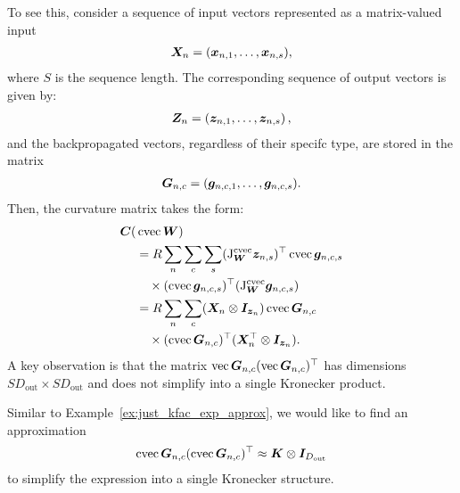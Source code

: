 To see this, consider a sequence of input vectors represented as a matrix-valued input
\begin{align*}
  {\bm{X}}_n = ({\bm{x}}_{n, 1}, \dots, {\bm{x}}_{n, s}),
\end{align*}
where $S$ is the sequence length.
The corresponding sequence of output vectors is given by:
\begin{align*}
{\bm{Z}}_n = \left( {\bm{z}}_{n, 1}, \dots, {\bm{z}}_{n,s} \right),
\end{align*}
and the backpropagated vectors, regardless of their specifc type, are stored in the matrix
\begin{align*}
{\bm{G}}_{n, c} = ({\bm{g}}_{n, c, 1}, \dots, {\bm{g}}_{n, c, s}).
\end{align*}
Then, the curvature matrix takes the form:
\begin{align*}
  {\bm{C}}(&\operatorname{cvec} {\bm{W}})
  \\
  &=
    R
    \sum_n \sum_c \sum_s
    (\mathrm{J}^{\operatorname{cvec}}_{{\bm{W}}}{\bm{z}}_{n,s})^{\top}\operatorname{cvec}{\bm{g}}_{n,c,s}\\
 &\quad \times(\operatorname{cvec}{\bm{g}}_{n,c,s})^{\top}
   (\mathrm{J}^{\operatorname{cvec}}_{{\bm{W}}}{\bm{g}}_{n,c,s}) \\
 &=
   R
   \sum_n \sum_c ({\bm{X}}_n \otimes {\bm{I}}_{{\bm{z}}_n}) \operatorname{cvec} {\bm{G}}_{n,c}
 \\
 &\quad \times
 (\operatorname{cvec} {\bm{G}}_{n,c})^{\top}
   ({\bm{X}}_n^{\top} \otimes {\bm{I}}_{{\bm{z}}_n}).
\end{align*}
A key observation is that the matrix $\operatorname{vec}{\bm{G}}_{n,c} (\operatorname{vec}{\bm{G}}_{n,c})^{\top}$ has dimensions $S D_{\text{out}} \times S D_{\text{out}}$ and does not simplify into a single Kronecker product.

Similar to Example~\ref{ex:just_kfac_exp_approx}, we would like to find an approximation
\begin{align*}
\operatorname{cvec}{\bm{G}}_{n,c} (\operatorname{cvec}{\bm{G}}_{n,c})^{\top} \approx {\bm{K}} \otimes {\bm{I}}_{D_\text{out}}
\end{align*}
to simplify the expression into a single Kronecker structure.

